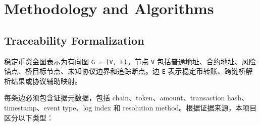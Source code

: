 \documentclass[12pt,a4paper]{ctexart}
\begin{document}
\hypertarget{methodology-and-algorithms}{%
\section{Methodology and Algorithms}\label{methodology-and-algorithms}}

\hypertarget{traceability-formalization}{%
\subsection{Traceability
Formalization}\label{traceability-formalization}}

稳定币资金图表示为有向图 \texttt{G\ =\ (V,\ E)}。节点 \texttt{V}
包括普通地址、合约地址、风险锚点、桥目标节点、未知协议边界和追踪断点。边
\texttt{E} 表示稳定币转账、跨链桥解析结果或协议辅助映射。

每条边必须包含证据元数据，包括 chain、token、amount、transaction
hash、timestamp、event type、log index 和 resolution
method。根据证据来源，本项目区分以下类型：
\end{document}
